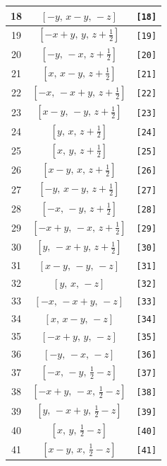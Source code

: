 \documentclass[fleqn,8pt]{jsarticle}
\begin{document}
\begin{longtable}{ccc}
18 & $\left[ - y,\, x - y,\, - z \right]$ & {\tt [18]} \\ \hline
19 & $\left[ - x + y,\, y,\, z + \frac{1}{2} \right]$ & {\tt [19]} \\ \hline
20 & $\left[ - y,\, - x,\, z + \frac{1}{2} \right]$ & {\tt [20]} \\ \hline
21 & $\left[ x,\, x - y,\, z + \frac{1}{2} \right]$ & {\tt [21]} \\ \hline
22 & $\left[ - x,\, - x + y,\, z + \frac{1}{2} \right]$ & {\tt [22]} \\ \hline
23 & $\left[ x - y,\, - y,\, z + \frac{1}{2} \right]$ & {\tt [23]} \\ \hline
24 & $\left[ y,\, x,\, z + \frac{1}{2} \right]$ & {\tt [24]} \\ \hline
25 & $\left[ x,\, y,\, z + \frac{1}{2} \right]$ & {\tt [25]} \\ \hline
26 & $\left[ x - y,\, x,\, z + \frac{1}{2} \right]$ & {\tt [26]} \\ \hline
27 & $\left[ - y,\, x - y,\, z + \frac{1}{2} \right]$ & {\tt [27]} \\ \hline
28 & $\left[ - x,\, - y,\, z + \frac{1}{2} \right]$ & {\tt [28]} \\ \hline
29 & $\left[ - x + y,\, - x,\, z + \frac{1}{2} \right]$ & {\tt [29]} \\ \hline
30 & $\left[ y,\, - x + y,\, z + \frac{1}{2} \right]$ & {\tt [30]} \\ \hline
31 & $\left[ x - y,\, - y,\, - z \right]$ & {\tt [31]} \\ \hline
32 & $\left[ y,\, x,\, - z \right]$ & {\tt [32]} \\ \hline
33 & $\left[ - x,\, - x + y,\, - z \right]$ & {\tt [33]} \\ \hline
34 & $\left[ x,\, x - y,\, - z \right]$ & {\tt [34]} \\ \hline
35 & $\left[ - x + y,\, y,\, - z \right]$ & {\tt [35]} \\ \hline
36 & $\left[ - y,\, - x,\, - z \right]$ & {\tt [36]} \\ \hline
37 & $\left[ - x,\, - y,\, \frac{1}{2} - z \right]$ & {\tt [37]} \\ \hline
38 & $\left[ - x + y,\, - x,\, \frac{1}{2} - z \right]$ & {\tt [38]} \\ \hline
39 & $\left[ y,\, - x + y,\, \frac{1}{2} - z \right]$ & {\tt [39]} \\ \hline
40 & $\left[ x,\, y,\, \frac{1}{2} - z \right]$ & {\tt [40]} \\ \hline
41 & $\left[ x - y,\, x,\, \frac{1}{2} - z \right]$ & {\tt [41]} \\ \hline

\end{longtable}
\end{document}

